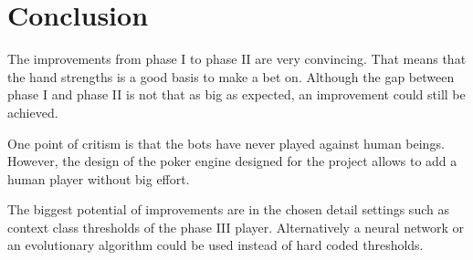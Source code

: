 \chapter{Conclusion}
The improvements from phase I to phase II are very convincing. That means that the hand strengths is a good basis to make a bet on. Although the gap between phase I and phase II is not that as big as expected, an improvement could still be achieved.

One point of critism is that the bots have never played against human beings. However, the design of the poker engine designed for the project allows to add a human player without big effort.

The biggest potential of improvements are in the chosen detail settings such as context class thresholds of the phase III player. Alternatively a neural network or an evolutionary algorithm could be used instead of hard coded thresholds.
